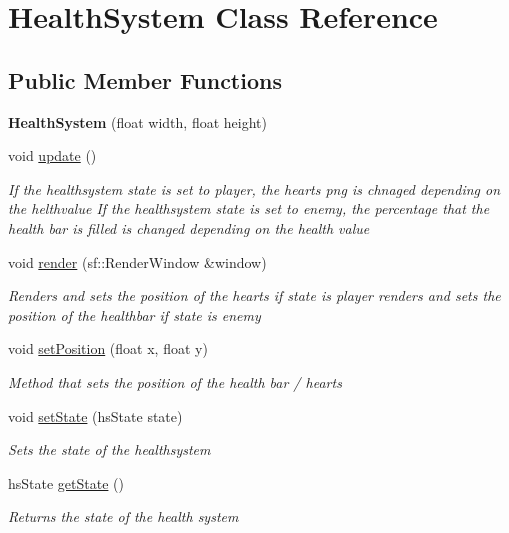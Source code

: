 \hypertarget{class_health_system}{}\section{Health\+System Class Reference}
\label{class_health_system}
\subsection*{Public Member Functions}
\begin{DoxyCompactItemize}
\item 
\mbox{\label{class_health_system_abbcc6e0dd6abe767873ee03bc0cdb656}} 
{\bfseries Health\+System} (float width, float height)
\item 
void \mbox{\hyperlink{class_health_system_a9378f97771d046d67c794c3ec08f3d9e}{update}} ()
\begin{DoxyCompactList}\small\item\em If the healthsystem state is set to player, the hearts png is chnaged depending on the helthvalue If the healthsystem state is set to enemy, the percentage that the health bar is filled is changed depending on the health value \end{DoxyCompactList}\item 
void \mbox{\hyperlink{class_health_system_ae0ef2aa8b9b040f3b973a3f220b5b19e}{render}} (sf\+::\+Render\+Window \&window)
\begin{DoxyCompactList}\small\item\em Renders and sets the position of the hearts if state is player renders and sets the position of the healthbar if state is enemy \end{DoxyCompactList}\item 
void \mbox{\hyperlink{class_health_system_ad07dc3ea58beaead2f660a8f11dc5997}{set\+Position}} (float x, float y)
\begin{DoxyCompactList}\small\item\em Method that sets the position of the health bar / hearts \end{DoxyCompactList}\item 
void \mbox{\hyperlink{class_health_system_a01566694009124a5994accfa1cecb687}{set\+State}} (hs\+State state)
\begin{DoxyCompactList}\small\item\em Sets the state of the healthsystem \end{DoxyCompactList}\item 
hs\+State \mbox{\hyperlink{class_health_system_ab64ef1ddec39477ac49dcf6390294201}{get\+State}} ()
\begin{DoxyCompactList}\small\item\em Returns the state of the health system \end{DoxyCompactList}\end{DoxyCompactItemize}
